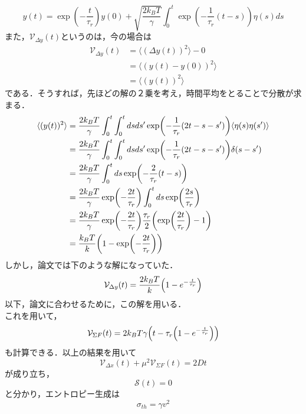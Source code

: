 \documentclass{jsarticle}
\numberwithin{equation}{section}
\theoremstyle{definition}
\newcommand{\ave}[1]{\langle #1 \rangle}
\begin{document}
\begin{equation}
  y(t) = \exp( -\frac{t}{\tau_r}) y(0) + \sqrt{\frac{2k_B T}{\gamma}} \int_0^t \exp( -\frac{1}{\tau_r} (t-s) ) \eta(s) ds 
\end{equation}
また，$\mathcal{V}_{\Delta y} (t)$というのは，今の場合は
\begin{align}
  \mathcal{V}_{\Delta y} (t) &= \ave{(\Delta y (t))^2} - 0 \\
  &= \ave{(y(t) - y(0))^2} \\
  &= \ave{(y(t))^2} 
\end{align}
である．そうすれば，先ほどの解の２乗を考え，時間平均をとることで分散が求まる．
\begin{align}
  \ave{(y(t))^2}  &= \frac{2k_B T}{\gamma} \int_0^t \int_0^t ds ds' \exp( -\frac{1}{\tau_r} (2t-s-s') ) \ave{\eta(s) \eta(s') } \\
  &= \frac{2k_B T}{\gamma} \int_0^t \int_0^t ds ds' \exp( -\frac{1}{\tau_r} (2t-s-s') ) \delta(s-s') \\
  &= \frac{2k_B T}{\gamma} \int_0^t ds \exp( -\frac{2}{\tau_r} (t-s) ) \\
  &= \frac{2k_B T}{\gamma} \exp( -\frac{2t}{\tau_r} ) \int_0^t ds \exp( \frac{2s}{\tau_r} ) \\
  &= \frac{2k_B T}{\gamma} \exp( -\frac{2t}{\tau_r} ) \frac{\tau_r}{2} \qty(\exp(\frac{2t}{\tau_r}) - 1) \\
  &= \frac{k_B T}{k} \qty(1 - \exp(-\frac{2t}{\tau_r})) \\
\end{align}
しかし，論文では下のような解になっていた．
\begin{equation}
  \mathcal{V}_{\Delta y} (t) = \frac{2 k_B T}{k} \qty( 1 - e^{-\frac{t}{\tau_r}} )
\end{equation}
以下，論文に合わせるために，この解を用いる．\\
\quad これを用いて，
\begin{equation}
  \mathcal{V}_{\Sigma F} (t) = 2 k_B T \gamma \qty( t - \tau_r \qty( 1 - e^{-\frac{t}{\tau_r}} ) )
\end{equation}
も計算できる．以上の結果を用いて
\begin{equation}
  \mathcal{V}_{\Delta x} (t) + \mu^2 \mathcal{V}_{\Sigma F} (t) = 2Dt 
\end{equation}
が成り立ち，
\begin{equation}
  \mathcal{S} (t) = 0 
\end{equation}
と分かり，エントロピー生成は
\begin{equation}
  \sigma_{th} = \gamma v^2
\end{equation}
\end{document}
